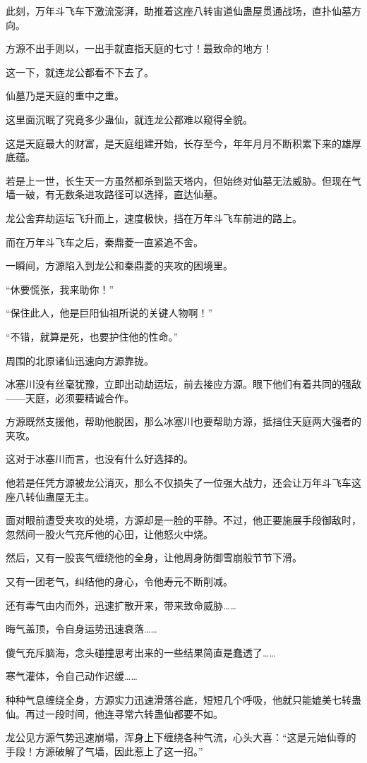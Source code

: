 \begin{this_body}
此刻，万年斗飞车下激流澎湃，助推着这座八转宙道仙蛊屋贯通战场，直扑仙墓方向。

方源不出手则以，一出手就直指天庭的七寸！最致命的地方！

这一下，就连龙公都看不下去了。

仙墓乃是天庭的重中之重。

这里面沉眠了究竟多少蛊仙，就连龙公都难以窥得全貌。

这是天庭最大的财富，是天庭组建开始，长存至今，年年月月不断积累下来的雄厚底蕴。

若是上一世，长生天一方虽然都杀到监天塔内，但始终对仙墓无法威胁。但现在气墙一破，有无数条进攻路径可以选择，直达仙墓。

龙公舍弃劫运坛飞升而上，速度极快，挡在万年斗飞车前进的路上。

而在万年斗飞车之后，秦鼎菱一直紧追不舍。

一瞬间，方源陷入到龙公和秦鼎菱的夹攻的困境里。

“休要慌张，我来助你！”

“保住此人，他是巨阳仙祖所说的关键人物啊！”

“不错，就算是死，也要护住他的性命。”

周围的北原诸仙迅速向方源靠拢。

冰塞川没有丝毫犹豫，立即出动劫运坛，前去接应方源。眼下他们有着共同的强敌——天庭，必须要精诚合作。

方源既然支援他，帮助他脱困，那么冰塞川也要帮助方源，抵挡住天庭两大强者的夹攻。

这对于冰塞川而言，也没有什么好选择的。

他若是任凭方源被龙公消灭，那么不仅损失了一位强大战力，还会让万年斗飞车这座八转仙蛊屋无主。

面对眼前遭受夹攻的处境，方源却是一脸的平静。不过，他正要施展手段御敌时，忽然间一股火气充斥他的心田，让他怒火中烧。

然后，又有一股丧气缠绕他的全身，让他周身防御雪崩般节节下滑。

又有一团老气，纠结他的身心，令他寿元不断削减。

还有毒气由内而外，迅速扩散开来，带来致命威胁……

晦气盖顶，令自身运势迅速衰落……

傻气充斥脑海，念头碰撞思考出来的一些结果简直是蠢透了……

寒气灌体，令自己动作迟缓……

种种气息缠绕全身，方源实力迅速滑落谷底，短短几个呼吸，他就只能媲美七转蛊仙。再过一段时间，他连寻常六转蛊仙都要不如。

龙公见方源气势迅速崩塌，浑身上下缠绕各种气流，心头大喜：“这是元始仙尊的手段！方源破解了气墙，因此惹上了这一招。”


\end{this_body}

